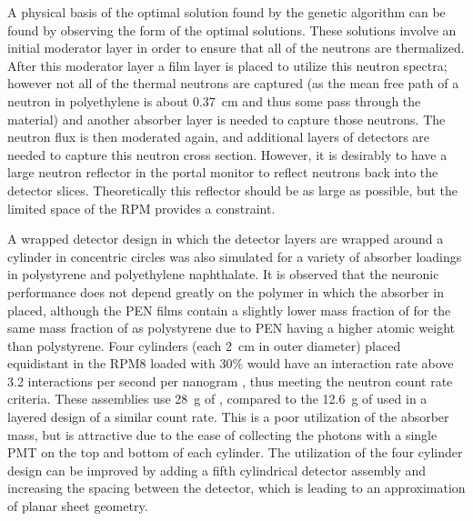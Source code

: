 A physical basis of the optimal solution found by the genetic algorithm can be found by observing the form of the optimal solutions.
These solutions involve an initial moderator layer in order to ensure that all of the neutrons are thermalized.
After this moderator layer a film layer is placed to utilize this neutron spectra; however not all of the thermal neutrons are captured (as the mean free path of a neutron in polyethylene is about \SI{0.37}{\cm} and thus some pass through the material) and another absorber layer is needed to capture those neutrons.  
The neutron flux is then moderated again, and additional layers of detectors are needed to capture this neutron cross section.
However, it is desirably to have a large neutron reflector in the portal monitor to reflect neutrons back into the detector slices. 
Theoretically this reflector should be as large as possible, but the limited space of the RPM provides a constraint.

A wrapped detector design in which the detector layers are wrapped around a cylinder in concentric circles was also simulated for a variety of absorber loadings in polystyrene and polyethylene naphthalate.
It is observed that the neuronic performance does not depend greatly on the polymer in which the absorber in placed, although the PEN films contain a slightly lower mass fraction of  for the same mass fraction of  as polystyrene due to PEN having a higher atomic weight than polystyrene.
Four cylinders (each \SI{2}{\cm} in outer diameter) placed equidistant in the RPM8 loaded with 30\%  would have an interaction rate above 3.2 interactions per second per nanogram , thus meeting the neutron count rate criteria. These assemblies use \SI{28}{\gram} of , compared to the \SI{12.6}{\gram} of  used in a layered design of a similar count rate.
This is a poor utilization of the absorber mass, but is attractive due to the ease of collecting the photons with a single PMT on the top and bottom of each cylinder.
The  utilization of the four cylinder design can be improved by adding a fifth cylindrical detector assembly and increasing the spacing between the detector, which is leading to an approximation of planar sheet geometry.


